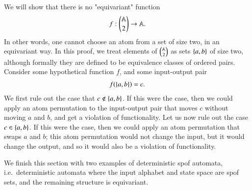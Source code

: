 \begin{myexample}\label{ex:choice-spof}
    We will show that there is no "equivariant" function 
    \begin{align*}
    f : {\mathbb A \choose 2} \to \mathbb A.
    \end{align*}
    In other words, one cannot choose an atom from a set of size two, in an equivariant way.
    In this proof, we treat elements of $\mathbb A \choose 2$ as sets $\{a,b\}$ of size two, although formally they are defined to be equivalence classes of ordered pairs.  Consider some hypothetical function $f$, and some  input-output pair 
    \begin{align*}
        f(\{a,b\})=c.
    \end{align*}
    We first rule out the case that $c \not \in \{a,b\}$. If this were the case, then  we could apply an  atom permutation to the input-output pair that moves $c$ without moving $a$ and $b$, and get a violation of functionality. Let us now rule out the case $c \in \{a,b\}$. If this were the case, then we could apply an atom permutation that swaps $a$ and $b$; this atom permutation would not change the input, but it would change the output, and so it would also be a violation of functionality. 
\end{myexample}


 We finish this section with two examples of deterministic spof automata, i.e.~deterministic automata where the input alphabet and state space are spof sets, and the remaining structure is equivariant. 

